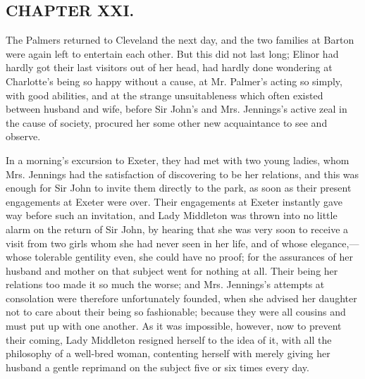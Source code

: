

\subsection[chapter-xxi.]{\useURL[url21][][][]\from[url21]CHAPTER XXI.}

The Palmers returned to Cleveland the next day, and the two families at Barton were again left to entertain each other. But this did not last long; Elinor had hardly got their last visitors out of her head, had hardly done wondering at Charlotte's being so happy without a cause, at Mr. Palmer's acting so simply, with good abilities, and at the strange unsuitableness which often existed between husband and wife, before Sir John's and Mrs. Jennings's active zeal in the cause of society, procured her some other new acquaintance to see and observe.

In a morning's excursion to Exeter, they had met with two young ladies, whom Mrs. Jennings had the satisfaction of discovering to be her relations, and this was enough for Sir John to invite them directly to the park, as soon as their present engagements at Exeter were over. Their engagements at Exeter instantly gave way before such an invitation, and Lady Middleton was thrown into no little alarm on the return of Sir John, by hearing that she was very soon to receive a visit from two girls whom she had never seen in her life, and of whose elegance,---whose tolerable gentility even, she could have no proof; for the assurances of her husband and mother on that subject went for nothing at all. Their being her relations too made it so much the worse; and Mrs. Jennings's attempts at consolation were therefore unfortunately founded, when she advised her daughter not to care about their being so fashionable; because they were all cousins and must put up with one another. As it was impossible, however, now to prevent their coming, Lady Middleton resigned herself to the idea of it, with all the philosophy of a well-bred woman, contenting herself with merely giving her husband a gentle reprimand on the subject five or six times every day.

